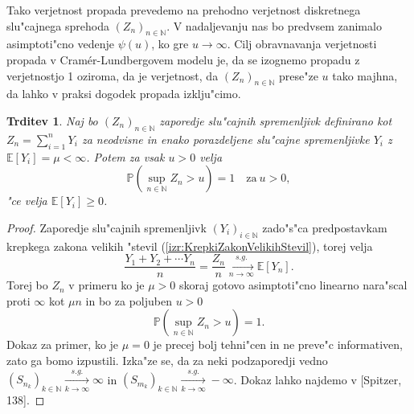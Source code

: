 \documentclass[12pt, a4paper, reqno]{amsart}
\theoremstyle{definition}
\theoremstyle{plain}
\newtheorem{trditev}[definicija]{Trditev}
\newcommand{\N}{\mathbb{N}}
\newcommand{\E}{\mathbb{E}}
\newcommand{\Prob}{\mathbb{P}}
\newcommand{\1}{\mathds{1}}
\begin{document}
        Tako verjetnost propada prevedemo na prehodno verjetnost diskretnega slu"cajnega 
        sprehoda $(Z_n)_{n\in\N}$. V nadaljevanju nas bo predvsem zanimalo asimptoti"cno 
        vedenje $\psi(u)$, ko gre $u\rightarrow\infty$. Cilj obravnavanja verjetnosti propada v 
        Cramér-Lundbergovem modelu je, da se izognemo 
        propadu z verjetnostjo 1 oziroma, da je verjetnost, da $(Z_n)_{n\in\N}$ prese"ze $u$
        tako majhna, da lahko v praksi dogodek propada izklju"cimo. 


        \begin{trditev}
            Naj bo $(Z_n)_{n\in\N}$ zaporedje slu"cajnih spremenljivk definirano kot 
            $Z_n = \sum_{i=1}^nY_i$ za neodvisne in enako porazdeljene slu"cajne spremenljivke 
            $Y_i$ z $\E\left[Y_i\right] = \mu < \infty$. Potem za vsak $u>0$ velja
            \begin{equation*}
                \Prob\left(\sup_{n\in\N}Z_n > u\right) = 1 \quad \text{za} \ u > 0,
            \end{equation*}
            "ce velja $\E\left[Y_i\right] \geq 0$.
            \label{trd:propadZVerjetnostjo1}
        \end{trditev}

        \begin{proof}
            Zaporedje slu"cajnih spremenljivk $(Y_i)_{i\in\N}$ zado"s"ca predpostavkam krepkega zakona
            velikih "stevil (\ref{izr:KrepkiZakonVelikihStevil}), torej velja
            \begin{equation*}
                \frac{Y_1 + Y_2 + \cdots Y_n}{n} = \frac{Z_n}{n} \xrightarrow[n\to\infty]{s.g.} \E\left[Y_n\right].
            \end{equation*}
            Torej bo $Z_n$ v primeru ko je $\mu>0$
             skoraj gotovo asimptoti"cno linearno nara"scal proti $\infty$ kot $\mu n$ in 
             bo za poljuben $u>0$
            \begin{equation*}
                \Prob\left(\sup_{n\in\N}Z_n > u\right) = 1.
            \end{equation*}
            Dokaz za primer, ko je $\mu = 0$ je precej bolj tehni"cen in ne preve"c informativen, zato 
            ga bomo izpustili. Izka"ze se, da za neki podzaporedji vedno
            $(S_{n_k})_{k\in\N} \xrightarrow[k\to\infty]{s.g.}\infty$ in 
            $(S_{m_k})_{k\in\N} \xrightarrow[k\to\infty]{s.g.}-\infty$.
            Dokaz lahko najdemo v [Spitzer, 138].
        \end{proof}
\end{document}

